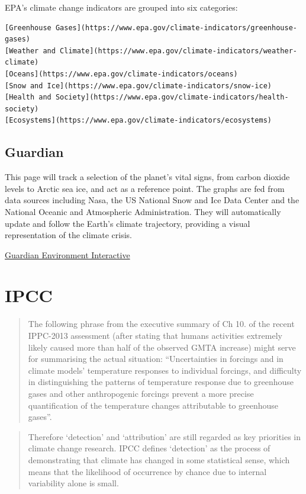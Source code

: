 \documentclass[
]{book}
\begin{document}
EPA's climate change indicators are grouped into six categories:

\begin{verbatim}
[Greenhouse Gases](https://www.epa.gov/climate-indicators/greenhouse-gases)
[Weather and Climate](https://www.epa.gov/climate-indicators/weather-climate)
[Oceans](https://www.epa.gov/climate-indicators/oceans)
[Snow and Ice](https://www.epa.gov/climate-indicators/snow-ice)
[Health and Society](https://www.epa.gov/climate-indicators/health-society)
[Ecosystems](https://www.epa.gov/climate-indicators/ecosystems)
\end{verbatim}

\hypertarget{guardian}{%
\section{Guardian}\label{guardian}}

This page will track a selection of the planet's vital signs, from carbon dioxide levels to Arctic sea ice, and act as a reference point. The graphs are fed from data sources including Nasa, the US National Snow and Ice Data Center and the National Oceanic and Atmospheric Administration. They will automatically update and follow the Earth's climate trajectory, providing a visual representation of the climate crisis.

\href{https://www.theguardian.com/environment/ng-interactive/2020/oct/05/climate-data-dashboard-carbon-atmosphere-sea-level-arctic-ice}{Guardian Environment Interactive}

\hypertarget{ipcc}{%
\chapter{IPCC}\label{ipcc}}

\begin{quote}
The following phrase from the executive summary of Ch 10. of
the recent IPPC-2013 assessment (after stating that humans activities
extremely likely caused more than half of the observed GMTA increase)
might serve for summarising the actual situation:
``Uncertainties in forcings and in climate models' temperature responses
to individual forcings, and difficulty in distinguishing the patterns of
temperature response due to greenhouse gases and other anthropogenic
forcings prevent a more precise quantification of the temperature changes
attributable to greenhouse gases''.
\end{quote}

\begin{quote}
Therefore `detection' and `attribution' are still regarded as key
priorities in climate change research. IPCC defines `detection' as
the process of demonstrating that climate has changed in some statistical
sense, which means that the likelihood of occurrence by chance due to
internal variability alone is small.
\end{quote}
\end{document}
